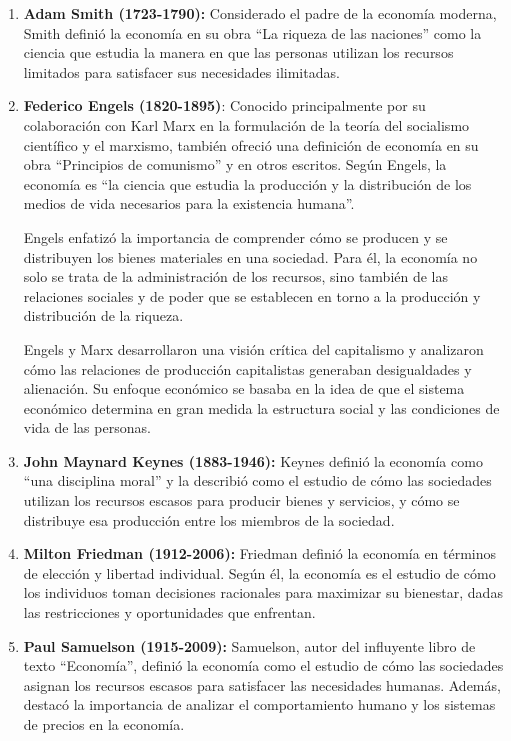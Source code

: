 \documentclass[
  jou,
  floatsintext,
  longtable,
  a4paper,
  nolmodern,
  notxfonts,
  notimes,
  12pt,
  colorlinks=true,linkcolor=blue,citecolor=blue,urlcolor=blue]{apa7}
\begin{document}
\begin{enumerate}
\def\labelenumi{\arabic{enumi}.}
\item
  \textbf{Adam Smith (1723-1790):} Considerado el padre de la economía
  moderna, Smith definió la economía en su obra ``La riqueza de las
  naciones'' como la ciencia que estudia la manera en que las personas
  utilizan los recursos limitados para satisfacer sus necesidades
  ilimitadas.
\item
  \textbf{Federico Engels (1820-1895)}: Conocido principalmente por su
  colaboración con Karl Marx en la formulación de la teoría del
  socialismo científico y el marxismo, también ofreció una definición de
  economía en su obra ``Principios de comunismo'' y en otros escritos.
  Según Engels, la economía es ``la ciencia que estudia la producción y
  la distribución de los medios de vida necesarios para la existencia
  humana''.

  Engels enfatizó la importancia de comprender cómo se producen y se
  distribuyen los bienes materiales en una sociedad. Para él, la
  economía no solo se trata de la administración de los recursos, sino
  también de las relaciones sociales y de poder que se establecen en
  torno a la producción y distribución de la riqueza.

  Engels y Marx desarrollaron una visión crítica del capitalismo y
  analizaron cómo las relaciones de producción capitalistas generaban
  desigualdades y alienación. Su enfoque económico se basaba en la idea
  de que el sistema económico determina en gran medida la estructura
  social y las condiciones de vida de las personas.
\item
  \textbf{John Maynard Keynes (1883-1946):} Keynes definió la economía
  como ``una disciplina moral'' y la describió como el estudio de cómo
  las sociedades utilizan los recursos escasos para producir bienes y
  servicios, y cómo se distribuye esa producción entre los miembros de
  la sociedad.
\item
  \textbf{Milton Friedman (1912-2006):} Friedman definió la economía en
  términos de elección y libertad individual. Según él, la economía es
  el estudio de cómo los individuos toman decisiones racionales para
  maximizar su bienestar, dadas las restricciones y oportunidades que
  enfrentan.
\item
  \textbf{Paul Samuelson (1915-2009):} Samuelson, autor del influyente
  libro de texto ``Economía'', definió la economía como el estudio de
  cómo las sociedades asignan los recursos escasos para satisfacer las
  necesidades humanas. Además, destacó la importancia de analizar el
  comportamiento humano y los sistemas de precios en la economía.
\end{enumerate}
\end{document}
